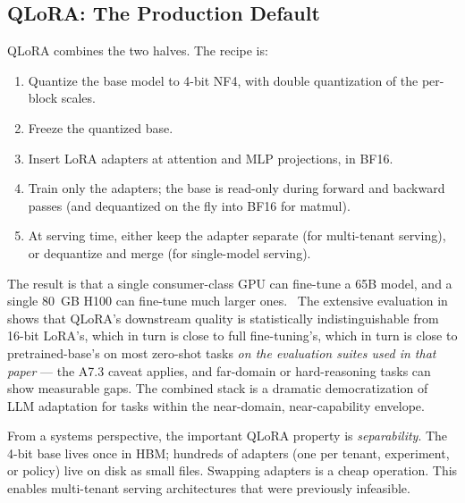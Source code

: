 \subsection{QLoRA: The Production Default}

QLoRA \citep{dettmers2023qlora} combines the two halves. The recipe
is:

\begin{enumerate}
  \item Quantize the base model to 4-bit NF4, with double quantization
        of the per-block scales.
  \item Freeze the quantized base.
  \item Insert LoRA adapters at attention and MLP projections, in
        BF16.
  \item Train only the adapters; the base is read-only during
        forward and backward passes (and dequantized on the fly
        into BF16 for matmul).
  \item At serving time, either keep the adapter separate (for
        multi-tenant serving), or dequantize and merge (for
        single-model serving).
\end{enumerate}

The result is that a single consumer-class GPU can fine-tune a 65B
model, and a single 80~GB H100 can fine-tune much larger ones. \Emp\
The extensive evaluation in \citet{dettmers2023qlora} shows that
QLoRA's downstream quality is statistically indistinguishable from
16-bit LoRA's, which in turn is close to full fine-tuning's, which
in turn is close to pretrained-base's on most zero-shot tasks
\emph{on the evaluation suites used in that paper} --- the A7.3
caveat applies, and far-domain or hard-reasoning tasks can show
measurable gaps. The combined stack is a dramatic democratization of
LLM adaptation for tasks within the near-domain, near-capability
envelope.

From a systems perspective, the important QLoRA property is
\emph{separability}. The 4-bit base lives once in HBM; hundreds of
adapters (one per tenant, experiment, or policy) live on disk as
small files. Swapping adapters is a cheap operation. This enables
multi-tenant serving architectures that were previously infeasible.

